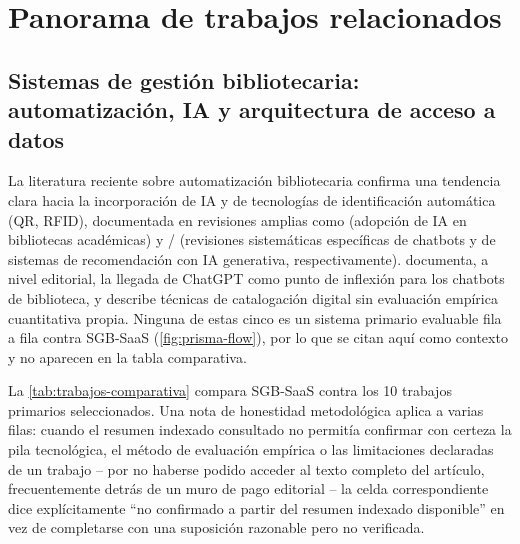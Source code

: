 \section{Panorama de trabajos relacionados}
\label{sec:panorama-relacionados}

\subsection{Sistemas de gestión bibliotecaria: automatización, IA y
arquitectura de acceso a datos}

La literatura reciente sobre automatización bibliotecaria confirma una
tendencia clara hacia la incorporación de IA y de tecnologías de
identificación automática (QR, RFID), documentada en revisiones amplias
como \citet{ayinde2026ai} (adopción de IA en bibliotecas académicas) y
\citet{yan2023chatbotsslr} / \citet{ayemowa2024genai} (revisiones
sistemáticas específicas de chatbots y de sistemas de recomendación con
IA generativa, respectivamente). \citet{adetayo2023chatgpt} documenta,
a nivel editorial, la llegada de ChatGPT como punto de inflexión para
los chatbots de biblioteca, y \citet{liabor2023cataloging} describe
técnicas de catalogación digital sin evaluación empírica cuantitativa
propia. Ninguna de estas cinco es un sistema primario evaluable
fila a fila contra SGB-SaaS (\autoref{fig:prisma-flow}), por lo que se
citan aquí como contexto y no aparecen en la tabla comparativa.

La \autoref{tab:trabajos-comparativa} compara SGB-SaaS contra los 10
trabajos primarios seleccionados. Una nota de honestidad metodológica
aplica a varias filas: cuando el resumen indexado consultado no permitía
confirmar con certeza la pila tecnológica, el método de evaluación
empírica o las limitaciones declaradas de un trabajo -- por no haberse
podido acceder al texto completo del artículo, frecuentemente detrás de
un muro de pago editorial -- la celda correspondiente dice
explícitamente ``no confirmado a partir del resumen indexado
disponible'' en vez de completarse con una suposición razonable pero no
verificada.

